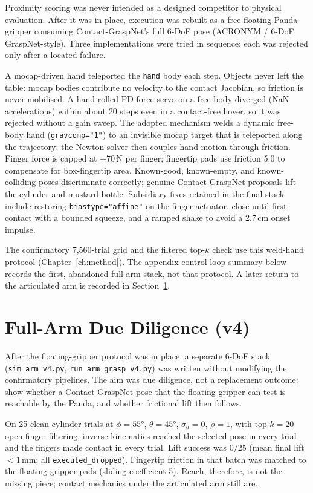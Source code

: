 \documentclass[11pt,a4paper]{report}
\begin{document}
Proximity scoring was never intended as a designed competitor to physical evaluation. After it was in place, execution was rebuilt as a free-floating Panda gripper consuming Contact-GraspNet's full 6-DoF pose (ACRONYM / 6-DoF GraspNet-style). Three implementations were tried in sequence; each was rejected only after a located failure.

A mocap-driven hand teleported the \texttt{hand} body each step. Objects never left the table: mocap bodies contribute no velocity to the contact Jacobian, so friction is never mobilised. A hand-rolled PD force servo on a free body diverged (NaN accelerations) within about 20 steps even in a contact-free hover, so it was rejected without a gain sweep. The adopted mechanism welds a dynamic free-body hand (\texttt{gravcomp="1"}) to an invisible mocap target that is teleported along the trajectory; the Newton solver then couples hand motion through friction. Finger force is capped at $\pm$70\,N per finger; fingertip pads use friction 5.0 to compensate for box-fingertip area. Known-good, known-empty, and known-colliding poses discriminate correctly; genuine Contact-GraspNet proposals lift the cylinder and mustard bottle. Subsidiary fixes retained in the final stack include restoring \texttt{biastype="affine"} on the finger actuator, close-until-first-contact with a bounded squeeze, and a ramped shake to avoid a 2.7\,cm onset impulse.

The confirmatory 7{,}560-trial grid and the filtered top-$k$ check use this weld-hand protocol (Chapter~\ref{ch:method}). The appendix control-loop summary below records the first, abandoned full-arm stack, not that protocol. A later return to the articulated arm is recorded in Section~\ref{sec:arm_v4}.

\section{Full-Arm Due Diligence (v4)}
\label{sec:arm_v4}

After the floating-gripper protocol was in place, a separate 6-DoF stack (\texttt{sim\_arm\_v4.py}, \texttt{run\_arm\_grasp\_v4.py}) was written without modifying the confirmatory pipelines. The aim was due diligence, not a replacement outcome: show whether a Contact-GraspNet pose that the floating gripper can test is reachable by the Panda, and whether frictional lift then follows.

On 25 clean cylinder trials at $\phi=55°$, $\theta=45°$, $\sigma_d=0$, $\rho=1$, with top-$k=20$ open-finger filtering, inverse kinematics reached the selected pose in every trial and the fingers made contact in every trial. Lift success was $0/25$ (mean final lift $<1$\,mm; all \texttt{executed\_dropped}). Fingertip friction in that batch was matched to the floating-gripper pads (sliding coefficient 5). Reach, therefore, is not the missing piece; contact mechanics under the articulated arm still are.
\end{document}
